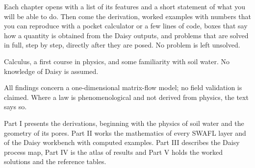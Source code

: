  Each chapter opens with a list of its features and a short statement of what you will be able to do. Then come the derivation, worked examples with numbers that you can reproduce with a pocket calculator or a few lines of code, boxes that say how a quantity is obtained from the Daisy outputs, and problems that are solved in full, step by step, directly after they are posed. No problem is left unsolved.

 Calculus, a first course in physics, and some familiarity with soil water. No knowledge of Daisy is assumed.

 All findings concern a one-dimensional matrix-flow model; no field validation is claimed. Where a law is phenomenological and not derived from physics, the text says so.

 Part I presents the derivations, beginning with the physics of soil water and the geometry of its pores. Part II works the mathematics of every SWAFL layer and of the Daisy workbench with computed examples. Part III describes the Daisy process map, Part IV is the atlas of results and Part V holds the worked solutions and the reference tables.
